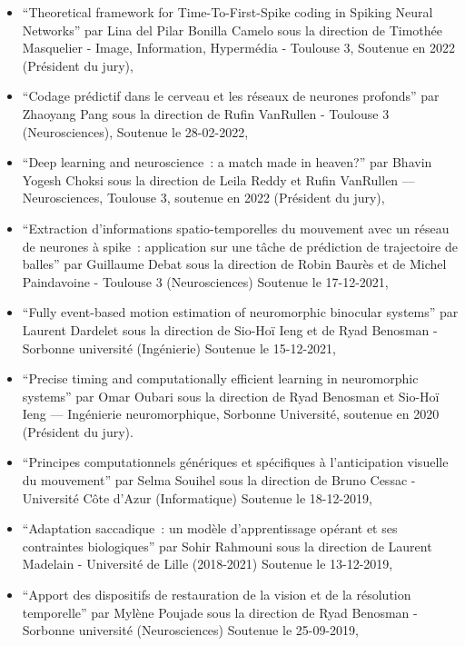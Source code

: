 \documentclass[10pt,french,a4paper,oneside]{article}%
\begin{document}
\begin{itemize}
    \item ``Theoretical framework for Time-To-First-Spike coding in Spiking Neural Networks'' par Lina del Pilar Bonilla Camelo sous la direction de Timothée Masquelier - Image, Information, Hypermédia - Toulouse 3, Soutenue en 2022 (Président du jury),

	\item ``Codage prédictif dans le cerveau et les réseaux de neurones profonds'' 	par Zhaoyang Pang sous la direction de Rufin VanRullen - Toulouse 3 (Neurosciences), Soutenue le 28-02-2022,

    \item ``Deep learning and neuroscience~: a match made in heaven?'' par Bhavin Yogesh Choksi sous la direction de Leila Reddy et Rufin VanRullen --- Neurosciences, Toulouse 3, soutenue en 2022 (Président du jury),

	\item ``Extraction d'informations spatio-temporelles du mouvement avec un réseau de neurones à spike~: application sur une tâche de prédiction de trajectoire de balles'' par Guillaume Debat sous la direction de Robin Baurès et de Michel Paindavoine - Toulouse 3  (Neurosciences) 	Soutenue le 17-12-2021,

	\item ``Fully event-based motion estimation of neuromorphic binocular systems'' par Laurent Dardelet sous la direction de Sio-Hoï Ieng et de Ryad Benosman - Sorbonne université (Ingénierie) Soutenue le 15-12-2021,

	\item ``Precise timing and computationally efficient learning in neuromorphic systems'' par Omar Oubari sous la direction de Ryad Benosman et Sio-Hoï Ieng --- Ingénierie neuromorphique, Sorbonne Université, soutenue en 2020 (Président du jury).

	\item ``Principes computationnels génériques et spécifiques à l'anticipation visuelle du mouvement'' par Selma Souihel sous la direction de Bruno Cessac - Université Côte d'Azur (Informatique) Soutenue le 18-12-2019,

	\item ``Adaptation saccadique~: un modèle d'apprentissage opérant et ses contraintes biologiques'' par Sohir Rahmouni sous la direction de Laurent Madelain - Université de Lille (2018-2021) Soutenue le 13-12-2019,

	\item ``Apport des dispositifs de restauration de la vision et de la résolution temporelle''  par Mylène Poujade sous la direction de Ryad Benosman - Sorbonne université	(Neurosciences) 	Soutenue le 25-09-2019,


\end{itemize}
\end{document}
